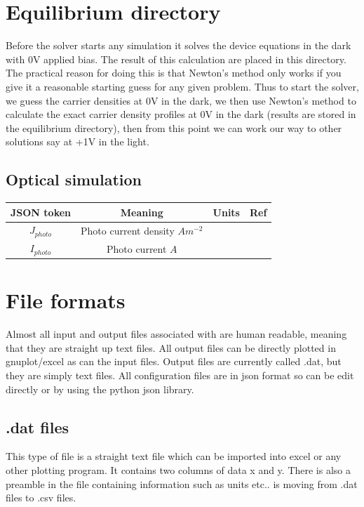 \section{Equilibrium directory}
Before the solver starts any simulation it solves the device equations in the dark with 0V applied bias.  The result of this calculation are placed in this directory.  The practical reason for doing this is that Newton's method only works if you give it a reasonable starting guess for any given problem.  Thus to start the solver, we guess the carrier densities at 0V in the dark, we then use Newton's method to calculate the exact carrier density profiles at 0V in the dark (results are stored in the equilibrium directory), then from this point we can work our way to other solutions say at +1V in the light.\cite{0953-8984-25-21-215301}


\subsection{Optical simulation}

\begin{center}
\begin{tabular}{ |c|c|c| c|} 
\hline
JSON token & Meaning & Units & Ref \\
\hline
$J_{photo}$ & Photo current density $Am^{-2}$& &\\
$I_{photo}$ & Photo current $A$& &\\


\hline
\end{tabular}
\end{center}


\section{File formats}
Almost all input and output files associated with \simname are human readable, meaning that they are straight up text files.  All output files can be directly plotted in gnuplot/excel as can the input files.  Output files are currently called .dat, but they are simply text files. All configuration files are in json format so can be edit directly or by using the python json library.

\subsection{.dat files}
This type of file is a straight text file which can be imported into excel or any other plotting program. It contains two columns of data x and y. There is also a preamble in the file containing information such as units etc..  \simname is moving from .dat files to .csv files.

